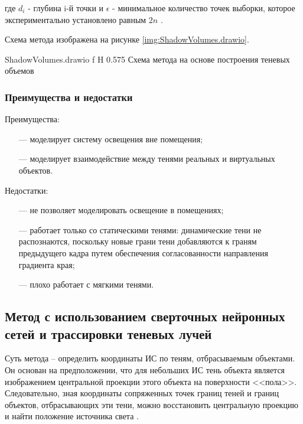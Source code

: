 где $d_i$ - глубина i-й точки и $\epsilon$ - минимальное количество точек выборки, которое экспериментально установлено равным $2n$ \cite{wei2019simulating}.

Схема метода изображена на рисунке \ref{img:ShadowVolumes.drawio}.

{ShadowVolumes.drawio}
{f}
{H}
{0.575\textwidth}
{Схема метода на основе построения теневых объемов}

\subsubsection*{Преимущества и недостатки}

Преимущества:
\begin{itemize}
	\item[---] моделирует систему освещения вне помещения;
	\item[---] моделирует взаимодействие между тенями реальных и виртуальных объектов.
\end{itemize}

Недостатки:
\begin{itemize}
	\item[---] не позволяет моделировать освещение в помещениях;
	\item[---] работает только со статическими тенями: динамические тени не распознаются, поскольку новые грани тени добавляются к граням предыдущего кадра путем обеспечения согласованности направления градиента края;
	\item[---] плохо работает с мягкими тенями.
\end{itemize}

\subsection{Метод с использованием сверточных нейронных сетей и трассировки теневых лучей}

Суть метода -- определить координаты ИС по теням, отбрасываемым объектами. Он основан на предположении, что для небольших ИС тень объекта является изображением центральной проекции этого объекта на поверхности <<пола>>. Следовательно, зная координаты сопряженных точек границ теней и границ объектов, отбрасывающих эти тени, можно восстановить центральную проекцию и найти положение источника света \cite{sns_tras}.

